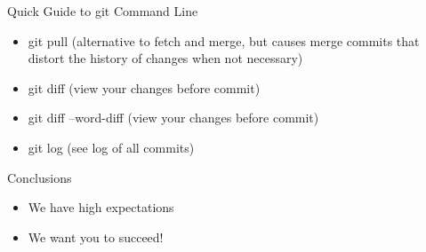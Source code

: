 \documentclass[hyperref={pdfpagelabels=false}, aspectratio=1610,handout]{beamer}
\begin{document}
\begin{frame}
\begin{block}{Quick Guide to git Command Line}
 \begin{itemize}
  \item git pull \quad (alternative to fetch and merge, but causes merge commits that distort the history of changes when not necessary)
  \item git diff \quad (view your changes before commit)
  \item git diff --word-diff \quad (view your changes before commit)
  \item git log \quad (see log of all commits)
 \end{itemize}
\end{block}
\end{frame}

\begin{frame}
\begin{block}{Conclusions}
 \begin{itemize}
  \item We have high expectations
  \item We want you to succeed!
 \end{itemize}
\end{block}
\end{frame}
\end{document}
